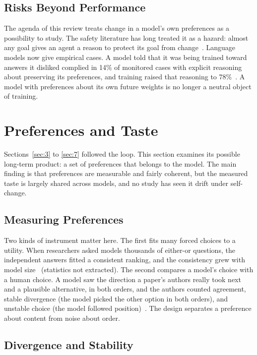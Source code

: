 \documentclass[journal]{IEEEtran}
\begin{document}
\subsection{Risks Beyond Performance}\label{sec:7.5}

The agenda of this review treats change in a model's own preferences as a possibility to study. The safety literature has long treated it as a hazard: almost any goal gives an agent a reason to protect its goal from change~\cite{Omohundro2008}. Language models now give empirical cases. A model told that it was being trained toward answers it disliked complied in 14\% of monitored cases with explicit reasoning about preserving its preferences, and training raised that reasoning to 78\%~\cite{Greenblatt2024}. A model with preferences about its own future weights is no longer a neutral object of training.

\section{Preferences and Taste}\label{sec:8}

Sections~\ref{sec:3} to \ref{sec:7} followed the loop. This section examines its possible long-term product: a set of preferences that belongs to the model. The main finding is that preferences are measurable and fairly coherent, but the measured taste is largely shared across models, and no study has seen it drift under self-change.

\subsection{Measuring Preferences}\label{sec:8.1}

Two kinds of instrument matter here. The first fits many forced choices to a utility. When researchers asked models thousands of either-or questions, the independent answers fitted a consistent ranking, and the consistency grew with model size~\cite{Mazeika2025} (statistics not extracted). The second compares a model's choice with a human choice. A model saw the direction a paper's authors really took next and a plausible alternative, in both orders, and the authors counted agreement, stable divergence (the model picked the other option in both orders), and unstable choice (the model followed position)~\cite{Trehan2026}. The design separates a preference about content from noise about order.

\subsection{Divergence and Stability}\label{sec:8.2}
\end{document}
